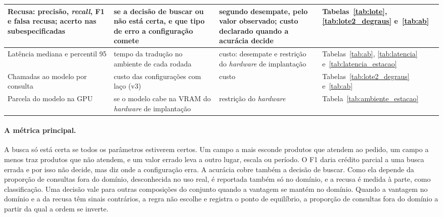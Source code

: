 \begin{table}[htbp!]
\begin{tabular}{|>{\raggedright\arraybackslash}p{3.0cm}|>{\raggedright\arraybackslash}p{4.2cm}|>{\raggedright\arraybackslash}p{3.7cm}|>{\raggedright\arraybackslash}p{3.0cm}|}
Recusa: precisão, \textit{recall}, F1 e falsa recusa; acerto nas subespecificadas & se a decisão de buscar ou não está certa, e que tipo de erro a configuração comete & segundo desempate, pelo valor observado; custo declarado quando a acurácia decide & Tabelas~\ref{tab:lote}, \ref{tab:lote2_degraus} e~\ref{tab:ab} \\ \hline
Latência mediana e percentil 95 & tempo da tradução no ambiente de cada rodada & custo: desempate e restrição do \textit{hardware} de implantação & Tabelas~\ref{tab:ab}, \ref{tab:latencia} e~\ref{tab:latencia_estacao} \\ \hline
Chamadas ao modelo por consulta & custo das configurações com laço (v3) & custo & Tabelas~\ref{tab:lote2_degraus} e~\ref{tab:ab} \\ \hline
Parcela do modelo na GPU & se o modelo cabe na VRAM do \textit{hardware} de implantação & restrição do \textit{hardware} & Tabela~\ref{tab:ambiente_estacao} \\ \hline
\end{tabular}
\end{table}

\paragraph{A métrica principal.} A busca só está certa se todos os parâmetros estiverem certos. Um campo a mais esconde produtos que atendem ao pedido, um campo a menos traz produtos que não atendem, e um valor errado leva a outro lugar, escala ou período. O F1 daria crédito parcial a uma busca errada e por isso não decide, mas diz onde a configuração erra. A acurácia cobre também a decisão de buscar. Como ela depende da proporção de consultas fora do domínio, desconhecida no uso real, é reportada também só no domínio, e a recusa é medida à parte, como classificação. Uma decisão vale para outras composições do conjunto quando a vantagem se mantém no domínio. Quando a vantagem no domínio e a da recusa têm sinais contrários, a regra não escolhe e registra o ponto de equilíbrio, a proporção de consultas fora do domínio a partir da qual a ordem se inverte.

